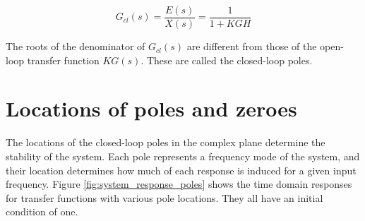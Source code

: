 \begin{equation}
  G_{cl}(s) = \frac{E(s)}{X(s)} = \frac{1}{1 + KGH}
\end{equation}

The roots of the denominator of $G_{cl}(s)$ are different from those of the
open-loop transfer function $KG(s)$. These are called the closed-loop poles.

\section{Locations of poles and zeroes}

The locations of the closed-loop poles in the complex plane determine the
stability of the \gls{system}. Each pole represents a frequency mode of the
\gls{system}, and their location determines how much of each response is induced
for a given input frequency. Figure \ref{fig:system_response_poles} shows the
time domain responses for transfer functions with various pole locations. They
all have an initial condition of one.

